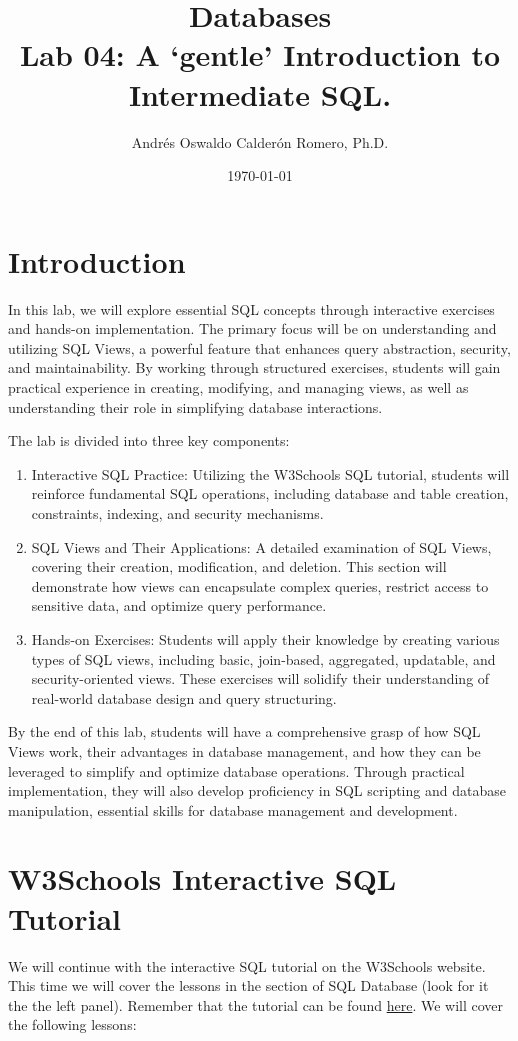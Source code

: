 \documentclass{article}
\title{Databases \\ Lab 04: A `gentle' Introduction to Intermediate SQL.}
\author{Andrés Oswaldo Calderón Romero, Ph.D.}
\date{\today}
\begin{document}
\maketitle

\section{Introduction}
In this lab, we will explore essential SQL concepts through interactive exercises and hands-on implementation. The primary focus will be on understanding and utilizing SQL Views, a powerful feature that enhances query abstraction, security, and maintainability. By working through structured exercises, students will gain practical experience in creating, modifying, and managing views, as well as understanding their role in simplifying database interactions.

The lab is divided into three key components:

\begin{enumerate}
  \item Interactive SQL Practice: Utilizing the W3Schools SQL tutorial, students will reinforce fundamental SQL operations, including database and table creation, constraints, indexing, and security mechanisms.
  \item SQL Views and Their Applications: A detailed examination of SQL Views, covering their creation, modification, and deletion. This section will demonstrate how views can encapsulate complex queries, restrict access to sensitive data, and optimize query performance.
  \item Hands-on Exercises: Students will apply their knowledge by creating various types of SQL views, including basic, join-based, aggregated, updatable, and security-oriented views. These exercises will solidify their understanding of real-world database design and query structuring.

\end{enumerate}

By the end of this lab, students will have a comprehensive grasp of how SQL Views work, their advantages in database management, and how they can be leveraged to simplify and optimize database operations. Through practical implementation, they will also develop proficiency in SQL scripting and database manipulation, essential skills for database management and development.

\section{W3Schools Interactive SQL Tutorial} \label{sec:w3s}
We will continue with the interactive SQL tutorial on the W3Schools website.  This time we will cover the lessons in the section of SQL Database (look for it the the left panel). Remember that the tutorial can be found \href{https://www.w3schools.com/sql/}{here}. We will cover the following lessons:
\end{document}
